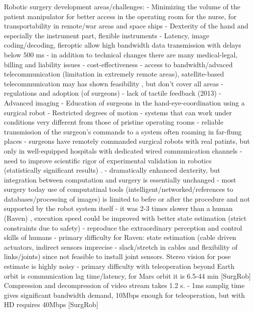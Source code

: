 Robotic surgery development areas/challenges:
- Minimizing the volume of the patient manipulator for better access in the operating room for the nurse, for transportability in remote/war areas and space ships
- Dexterity of the hand and especially the instrument part, flexible instruments
- Latency, image coding/decoding, fieroptic allow high bandwidth data transmission with delays below 500 ms
- in addition to technical changes there are many medical-legal, billing and liability issues
- cost-effectiveness
- access to bandwidth/advaced telecommunication (limitation in extremely remote areas), satellite-based telecommunication may has shown feasibility \citep{bib:telesurg_history}, but don't cover all areas \citep{bib:docatadist}
- regulations and adoption (of surgeons)
- lack of tactile feedback (2013)
- Advanced imaging
- Education of surgeons in the hand-eye-coordination using a surgical robot
- Restricted degrees of motion
- systems that can work under conditions very different from those of pristine operating rooms \citep{bib:docatadist}
- reliable transmission of the surgeon's commands to a system often roaming in far-flung places
- surgeons have remotely commanded surgical robots with real patints, but only in well-equipped hospitals with dedicated wired communication channels
- need to improve scientific rigor of experimental validation in robotics (statistically significant results) \citep{bib:raven_ii}.
- dramatically enhanced dexterity, but integration between computation and surgery is essentially unchanged \citep{bib:raven_ii}
- most surgery today use of computatinal tools (intelligent/networked/references to databases/processing of images) is limited to befre or after the procedure and not supported by the robot system itself \citep{bib:raven_ii}
- it was 2-3 times slower than a human (Raven) \citep{bib:raven_debride}, execution speed could be improved with better state estimation (strict constraints due to safety)
- reproduce the extraordinary perception and control skills of humans \citep{bib:raven_debride}
- primary difficulty for Raven: state estimation (cable driven actuators, indirect sensors imprecise - slack/stretch in cables and flexibility of links/joints) since not feasible to install joint sensors. Stereo vision for pose estimate is highly noisy \citep{bib:raven_debride}
- primary difficulty with teleoperation beyond Earth orbit is communication lag time/latency, for Mars orbit it is 6.5-44 min [SurgRob] Compression and decompression of video stream takes 1.2 s.
- 1ms samplig time gives significant bandwidth demand, 10Mbps enough for teleoperation, but with HD requires 40Mbps [SurgRob]



